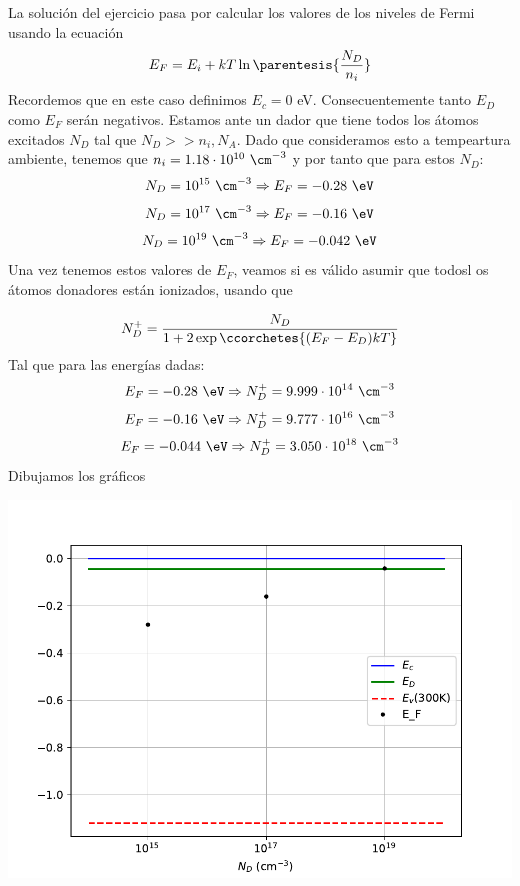 	La solución del ejercicio pasa por calcular los valores de los niveles de Fermi usando la ecuación
	\begin{equation}
		E_F = E_i + kT \ln \parentesis{\frac{N_D}{n_i}}
	\end{equation}
	Recordemos que en este caso definimos $E_{c}=0$ eV. Consecuentemente tanto $E_D$ como $E_F$ serán negativos. Estamos ante un dador que tiene todos los átomos excitados $N_D$ tal que $N_D>>n_i,N_A$. Dado que consideramos esto a tempeartura ambiente, tenemos que $n_i=1.18\cdot 10^{10} \ \cm^{-3}$ y por tanto que para estos $N_D$:
	\begin{equation}
		N_D=10^{15} \ \cm^{-3} \Rightarrow E_F = -0.28 \ \eV
	\end{equation}
	\begin{equation}
		N_D=10^{17} \ \cm^{-3} \Rightarrow E_F = -0.16  \ \eV
	\end{equation}
	\begin{equation}
		N_D=10^{19} \ \cm^{-3} \Rightarrow E_F = -0.042\ \eV
	\end{equation}
	Una vez tenemos estos valores de $E_F$, veamos si es válido asumir que todosl os átomos donadores están ionizados, usando que

	\begin{equation}
		N_D^+ = \frac{N_D}{1+2\exp\ccorchetes{(E_F-E_D)kT}}
	\end{equation}
	Tal que para las energías dadas:
	\begin{equation}
		E_F= -0.28  \ \eV \Rightarrow N_D^+ =  9.999\cdot 10^{14}  \ \cm^{-3}
	\end{equation}
	\begin{equation}
		E_F = -0.16 \ \eV\Rightarrow N_D^+ =  9.777\cdot 10^{16} \ \cm^{-3}
	\end{equation}
	\begin{equation}
		E_F =-0.044 \ \eV \Rightarrow N_D^+ = 3.050 \cdot 10^{18}  \ \cm^{-3}
	\end{equation}
	Dibujamos los gráficos
	\begin{center}
		\includegraphics[width=0.9\linewidth]{Cuerpo/Ch_01/Ejercicio_01_8.pdf}
	\end{center}
